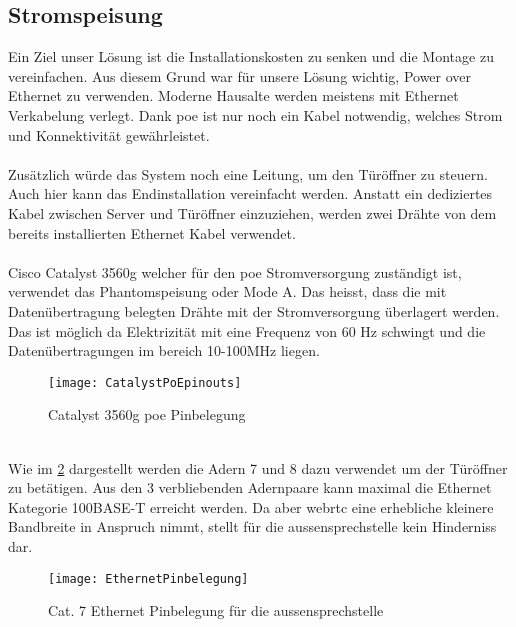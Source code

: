 \subsection{Stromspeisung}
\label{sec:poe}
Ein Ziel unser Lösung ist die Installationskosten zu senken und die Montage zu vereinfachen. Aus diesem Grund war für unsere Lösung wichtig, Power over Ethernet zu verwenden.
Moderne Hausalte werden meistens mit Ethernet Verkabelung verlegt. Dank \gls{poe} ist nur noch ein Kabel notwendig, welches Strom und Konnektivität gewährleistet.
\\
\\
Zusätzlich würde das System noch eine Leitung, um den Türöffner zu steuern.
Auch hier kann das Endinstallation vereinfacht werden. Anstatt ein dediziertes Kabel zwischen Server und Türöffner einzuziehen, werden zwei Drähte von dem bereits installierten Ethernet Kabel verwendet.
\\
\\
Cisco Catalyst 3560g welcher für den \gls{poe} Stromversorgung zuständigt ist, verwendet das Phantomspeisung oder Mode A. Das heisst, dass die mit Datenübertragung belegten Drähte mit der Stromversorgung überlagert werden. Das ist möglich da Elektrizität mit eine Frequenz von 60 Hz schwingt und die Datenübertragungen im bereich 10-100MHz liegen.
\begin{figure}[htb!]
	\begin{center}
		\texttt{[image: CatalystPoEpinouts]}
		\caption[Catalyst Pinouts]{Catalyst 3560g \gls{poe} Pinbelegung}
		\label{fig:catalystPinouts}
	\end{center}
\end{figure}
\\
Wie im \cref{fig:ethernetBelegung} dargestellt werden die Adern 7 und 8 dazu verwendet um der Türöffner zu betätigen. Aus den 3 verbliebenden Adernpaare kann maximal die Ethernet Kategorie 100BASE-T erreicht werden. Da aber \gls{webrtc} eine erhebliche kleinere Bandbreite in Anspruch nimmt, stellt für die \gls{aussensprechstelle} kein Hinderniss dar.

\begin{figure}[htb!]
	\begin{center}
		\texttt{[image: EthernetPinbelegung]}
		\caption[EthernetPinbelegung]{Cat. 7 Ethernet Pinbelegung für die \gls{aussensprechstelle}}
		\label{fig:ethernetBelegung}
	\end{center}
\end{figure}



